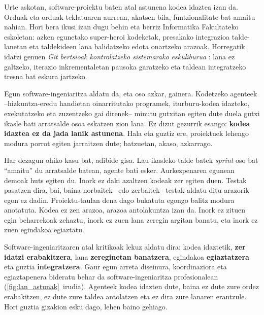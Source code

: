 
Urte askotan, software-proiektu baten atal astunena kodea idaztea izan da.
Orduak eta orduak teklatuaren aurrean, akatsen bila, funtzionalitate bat amaitu nahian.
Hori bera ikusi izan dugu behin eta berriz Informatika Fakultateko eskoletan: azken egunetako super-heroi kodeketak, presakako integrazioa talde-lanetan eta taldekideen lana balidatzeko edota onartzeko arazoak.
Horregatik idatzi genuen \textit{Git bertsioak kontrolatzeko sistemarako eskuliburua} \parencite{lopezgazpio2024git}: lana ez galtzeko, iterazio inkrementaletan pausoka garatzeko eta taldean integratzeko tresna bat eskura jartzeko.

Egun software-ingeniaritza aldatu da, eta oso azkar, gainera.
Kodetzeko agenteek --hizkuntza-eredu handietan oinarritutako programek, iturburu-kodea idazteko, exekutatzeko eta zuzentzeko gai direnek-- minutu gutxitan egiten dute duela gutxi ikasle bati arratsalde osoa eskatzen zion lana.
Ez dizut gezurrik esango: \textbf{kodea idaztea ez da jada lanik astunena}.
Hala eta guztiz ere, proiektuek lehengo modura porrot egiten jarraitzen dute; batzuetan, akaso, azkarrago.

Har dezagun ohiko kasu bat, adibide gisa.
Lau ikasleko talde batek \textit{sprint} oso bat ``amaitu'' du arratsalde batean, agente bati esker.
Aurkezpenaren egunean demoak huts egiten du.
Inork ez daki azaltzen kodeak zer egiten duen.
Testak pasatzen dira, bai, baina norbaitek --edo zerbaitek-- testak aldatu ditu arazorik egon ez dadin.
Proiektu-taulan dena dago bukatuta egongo balitz modura anotatuta.
Kodea ez zen arazoa, arazoa antolakuntza izan da. Inork ez zituen egin beharrekoak zehaztu, inork ez zuen lana zeregin argitan banatu, eta inork ez zuen egindakoa egiaztatu.

Software-ingeniaritzaren atal kritikoak lekuz aldatu dira: kodea idaztetik, \textbf{zer idatzi erabakitzera}, lana \textbf{zereginetan banatzera}, egindakoa \textbf{egiaztatzera} eta guztia \textbf{integratzera}.
Gaur egun arreta diseinura, koordinaziora eta egiaztapenera bideratu behar da software-ingeniaritza profesionalean (\ref{fig:lan_astunak}~irudia).
Agenteek kodea idazten dute, baina ez dute zure ordez erabakitzen, ez dute zure taldea antolatzen eta ez dira zure lanaren erantzule.
Hori guztia gizakion esku dago, lehen baino gehiago.

